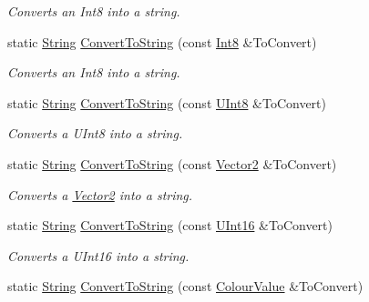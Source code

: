 \begin{DoxyCompactItemize}
\begin{DoxyCompactList}\small\item\em Converts an Int8 into a string. \item\end{DoxyCompactList}\item 
static \hyperlink{namespaceMezzanine_acf9fcc130e6ebf08e3d8491aebcf1c86}{String} \hyperlink{classMezzanine_1_1StringTool_a46fbc1d0337193ab7cd8b2fddba0028c}{ConvertToString} (const \hyperlink{namespaceMezzanine_acbb048ee99aa07566d5a6eb33f5a2c2d}{Int8} \&ToConvert)
\begin{DoxyCompactList}\small\item\em Converts an Int8 into a string. \item\end{DoxyCompactList}\item 
static \hyperlink{namespaceMezzanine_acf9fcc130e6ebf08e3d8491aebcf1c86}{String} \hyperlink{classMezzanine_1_1StringTool_a7833e43dc4d039a2d708de97ccfaf2ea}{ConvertToString} (const \hyperlink{namespaceMezzanine_aa5f38583d9025e05fa33d6e32e97b457}{UInt8} \&ToConvert)
\begin{DoxyCompactList}\small\item\em Converts a UInt8 into a string. \item\end{DoxyCompactList}\item 
static \hyperlink{namespaceMezzanine_acf9fcc130e6ebf08e3d8491aebcf1c86}{String} \hyperlink{classMezzanine_1_1StringTool_af56c701a2859d61d3588a638d5176775}{ConvertToString} (const \hyperlink{classMezzanine_1_1Vector2}{Vector2} \&ToConvert)
\begin{DoxyCompactList}\small\item\em Converts a \hyperlink{classMezzanine_1_1Vector2}{Vector2} into a string. \item\end{DoxyCompactList}\item 
static \hyperlink{namespaceMezzanine_acf9fcc130e6ebf08e3d8491aebcf1c86}{String} \hyperlink{classMezzanine_1_1StringTool_a8f5811cd7030a50a669cb8a775152cb2}{ConvertToString} (const \hyperlink{namespaceMezzanine_a1b6c09063432c7ddd87011c88306c767}{UInt16} \&ToConvert)
\begin{DoxyCompactList}\small\item\em Converts a UInt16 into a string. \item\end{DoxyCompactList}\item 
static \hyperlink{namespaceMezzanine_acf9fcc130e6ebf08e3d8491aebcf1c86}{String} \hyperlink{classMezzanine_1_1StringTool_a2cc1f3a264c33361db9b85457383975b}{ConvertToString} (const \hyperlink{classMezzanine_1_1ColourValue}{ColourValue} \&ToConvert)

\end{DoxyCompactItemize}
